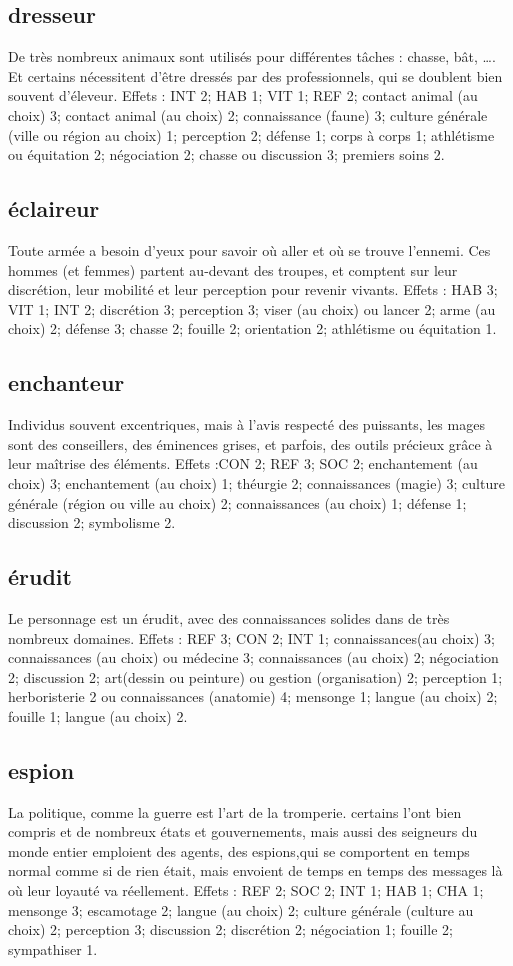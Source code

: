 \documentclass[10pt,a4paper,twocolumn]{book}
\begin{document}
\subsection*{dresseur}
De très nombreux animaux sont utilisés pour différentes tâches : chasse, bât, …. Et certains nécessitent d’être dressés par des professionnels, qui se doublent bien souvent d’éleveur.
Effets : INT 2; HAB 1; VIT 1; REF 2; contact animal (au choix) 3; contact animal (au choix) 2; connaissance (faune) 3; culture générale (ville ou région au choix) 1; perception 2; défense 1; corps à corps 1; athlétisme ou équitation 2; négociation 2; chasse ou discussion 3; premiers soins 2.
\subsection*{éclaireur}
Toute armée a besoin d’yeux pour savoir où aller et où se trouve l’ennemi. Ces hommes (et femmes) partent au-devant des troupes, et comptent sur leur discrétion, leur mobilité et leur perception pour revenir vivants.
Effets : HAB 3; VIT 1; INT 2; discrétion 3; perception 3; viser (au choix) ou lancer 2; arme (au choix) 2; défense 3; chasse 2; fouille 2; orientation 2; athlétisme ou équitation 1. 
\subsection*{enchanteur}
Individus souvent excentriques, mais à l’avis respecté des puissants, les mages sont des conseillers, des éminences grises, et parfois, des outils précieux grâce à leur maîtrise des éléments.
Effets :CON 2; REF 3; SOC 2; enchantement (au choix) 3; enchantement (au choix) 1; théurgie 2; connaissances (magie) 3; culture générale (région ou ville au choix) 2; connaissances (au choix) 1; défense 1; discussion 2; symbolisme 2.
\subsection*{érudit}
Le personnage est un érudit, avec des connaissances solides dans de très nombreux domaines.
Effets : REF 3; CON 2; INT 1; connaissances(au choix) 3; connaissances (au choix) ou médecine 3; connaissances (au choix) 2; négociation 2; discussion 2; art(dessin ou peinture) ou gestion (organisation) 2; perception 1; herboristerie 2 ou connaissances (anatomie) 4; mensonge 1; langue (au choix) 2; fouille 1; langue (au choix) 2.
\subsection*{espion}
La politique, comme la guerre est l’art de la tromperie. certains l’ont bien compris et de nombreux états et gouvernements, mais aussi des seigneurs du monde entier emploient des agents, des espions,qui se comportent en temps normal comme si de rien était, mais envoient de temps en temps des messages là où leur loyauté va réellement.
Effets : REF 2; SOC 2; INT 1; HAB 1; CHA 1; mensonge 3; escamotage 2; langue (au choix) 2; culture générale (culture au choix) 2; perception 3; discussion 2; discrétion 2; négociation 1; fouille 2; sympathiser 1.
\end{document}
